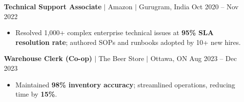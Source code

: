 \documentclass[11pt,a4paper]{article}
\begin{document}
\textbf{Technical Support Associate} $|$ Amazon $|$ Gurugram, India \hfill Oct 2020 -- Nov 2022
\begin{itemize}
    \item Resolved 1,000+ complex enterprise technical issues at \textbf{95\% SLA resolution rate}; authored SOPs and runbooks adopted by 10+ new hires.
\end{itemize}

\vspace{4pt}

\textbf{Warehouse Clerk (Co-op)} $|$ The Beer Store $|$ Ottawa, ON \hfill Aug 2023 -- Dec 2023
\begin{itemize}
    \item Maintained \textbf{98\% inventory accuracy}; streamlined operations, reducing time by \textbf{15\%}.
\end{itemize}
\end{document}
